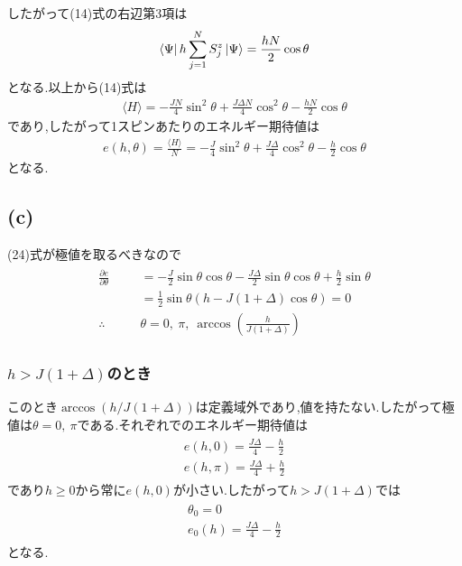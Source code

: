\documentclass[uplatex,a4j,11pt,dvipdfmx]{jsarticle}
\begin{document}
したがって(14)式の右辺第3項は
\begin{align}
  \Bra{\Psi}h\sum_{j=1}^NS_j^z\Ket{\Psi}=\frac{hN}{2}\cos\theta
\end{align}
となる.以上から(14)式は
\begin{align}
  \langle H\rangle=-\frac{JN}{4}\sin^2\theta+\frac{J\Delta N}{4}\cos^2\theta-\frac{hN}{2}\cos\theta
\end{align}
であり,したがって1スピンあたりのエネルギー期待値は
\begin{align}
  e(h,\theta)=\frac{\langle H\rangle}{N}=-\frac{J}{4}\sin^2\theta+\frac{J\Delta}{4}\cos^2\theta-\frac{h}{2}\cos\theta
\end{align}
となる.
\subsection*{(c)}
(24)式が極値を取るべきなので
\begin{align}
  \begin{split}
    \frac{\partial e}{\partial\theta}&=-\frac{J}{2}\sin\theta\cos\theta-\frac{J\Delta}{2}\sin\theta\cos\theta+\frac{h}{2}\sin\theta\\
    &=\frac{1}{2}\sin\theta\left(h-J(1+\Delta)\cos\theta\right)=0\\
    \therefore\qquad&\theta=0,\ \pi,\ \arccos\left(\frac{h}{J(1+\Delta)}\right) 
  \end{split}
\end{align}
\subsubsection*{$h>J(1+\Delta)$のとき}
このとき$\arccos(h/J(1+\Delta))$は定義域外であり,値を持たない.したがって極値は$\theta=0,\ \pi$である.それぞれでのエネルギー期待値は
\begin{align}
  \begin{split}
    e(h,0)=\frac{J\Delta}{4}-\frac{h}{2}\\
    e(h,\pi)=\frac{J\Delta}{4}+\frac{h}{2}
  \end{split}
\end{align}
であり$h\geq 0$から常に$e(h,0)$が小さい.したがって$h>J(1+\Delta)$では
\begin{align}
  \begin{split}
    \theta_0=0\\
    e_0(h)=\frac{J\Delta}{4}-\frac{h}{2}
  \end{split}
\end{align}
となる.
\end{document}
